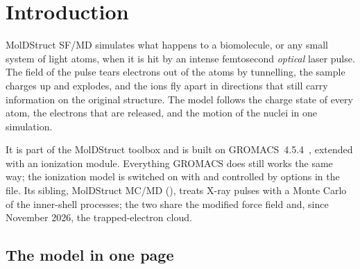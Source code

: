 \chapter{Introduction}
\label{ch:intro}

MolDStruct SF/MD simulates what happens to a biomolecule, or any small system of light atoms, when it is hit by an
intense femtosecond \emph{optical} laser pulse.
The field of the pulse tears electrons out of the atoms by tunnelling, the sample charges up and explodes, and the
ions fly apart in directions that still carry information on the original structure.
The model follows the charge state of every atom, the electrons that are released, and the motion of the nuclei in one
simulation.

It is part of the MolDStruct toolbox and is built on GROMACS~4.5.4~\cite{pronk2013}, extended with an ionization
module.
Everything GROMACS does still works the same way; the ionization model is switched on with  and
controlled by  options in the  file.
Its sibling, MolDStruct MC/MD (), treats X-ray pulses with a Monte Carlo of the inner-shell
processes; the two share the modified force field and, since November 2026, the trapped-electron cloud.

\section{The model in one page}


